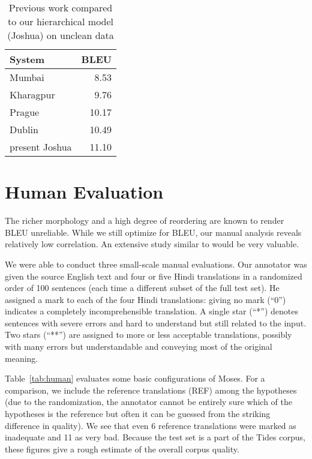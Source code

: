\documentclass[11pt]{article}
\def\Tref#1{Table~\ref{#1}}
\begin{document}
\begin{table}[ht]
\begin{centering}
\begin{tabular}{l|r}
\textbf{System} & \textbf{BLEU} \\
\hline
Mumbai \citep{Damani:2008} & 8.53\\
Kharagpur \citep{goswami:2008} & 9.76\\
Prague \citep{BoStEnglishHindiTranslation2008} & 10.17\\
Dublin \citep{srivastava:2008} & 10.49\\
present Joshua & 11.10\\
\end{tabular}
\caption{Previous work compared to our hierarchical model (Joshua) on unclean data}
\label{tab:previous}
\end{centering}
\end{table}



\section{Human Evaluation}
\label{human}



The richer morphology and a high degree of reordering are known to render BLEU
unreliable. While we still optimize for BLEU, our manual analysis reveals
relatively low correlation. An extensive study similar to
\cite{callisonburch-EtAl:2009:WMT} would be very valuable.

We were able to conduct three small-scale manual evaluations. Our
annotator was given the source English text and four or five Hindi translations in a
randomized order of 100
sentences (each time a different subset of the full test set). He assigned a
mark to each of the four Hindi translations: giving no
mark  (``0'') indicates a completely incomprehensible translation. A single star
(``*'') denotes sentences with severe errors and hard to understand but still
related to the input. Two stars (``**'') are assigned to more or less
acceptable translations, possibly with many errors but understandable and
conveying most of the original meaning.

\Tref{tab:human} evaluates some basic configurations of Moses. For a comparison,
we include the reference translations (REF) among the hypotheses (due to the
randomization, the annotator cannot be entirely sure which of the hypotheses is
the reference but often it can be guessed from the striking difference in
quality). We see that even 6 reference translations were marked as inadequate
and 11 as very bad. Because the test set is a part of the Tides corpus, these
figures give a rough estimate of the overall corpus quality.
\end{document}
